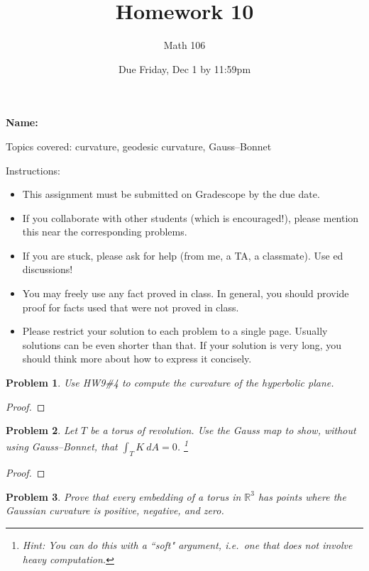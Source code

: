 \documentclass[11pt]{article}
\author{Math 106}
\date{Due Friday, Dec 1 by 11:59pm}
\title{Homework 10}
\newtheorem{problem}{Problem}
\begin{document}
\maketitle

{\bf\Large Name:} 


\vspace{.3in}
Topics covered: curvature, geodesic curvature, Gauss--Bonnet

Instructions: 
\begin{itemize}
\item This assignment must be submitted on Gradescope by the due date. 
\item If you collaborate with other students (which is encouraged!), please mention this near the corresponding problems. 
\item If you are stuck, please ask for help (from me, a TA, a classmate). Use ed discussions!  
\item You may freely use any fact proved in class. In general, you should provide proof for facts used that were not proved in class. 
\item Please restrict your solution to each problem to a single page. Usually solutions can be even shorter than that. If your solution is very long, you should think more about how to express it concisely.
\end{itemize}
\pagebreak 


\begin{problem}
Use HW9\#4 to compute the curvature of the hyperbolic plane. 
\end{problem}

\begin{proof}

\end{proof}

\pagebreak

\begin{problem}
Let $T$ be a torus of revolution. Use the Gauss map to show, without using Gauss--Bonnet, that $\int_T K\>dA=0$. \footnote{Hint: You can do this with a ``soft" argument, i.e.\ one that does not involve heavy computation.} 
\end{problem}

\begin{proof}

\end{proof}

\pagebreak

\begin{problem}
Prove that every embedding of a torus in $\mathbb R^3$ has points where the Gaussian curvature is positive, negative, and zero. 
\end{problem}
\end{document}
